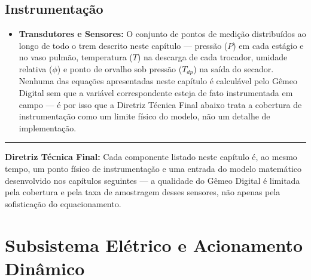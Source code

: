 \documentclass[12pt,a4paper]{article}
\numberwithin{equation}{section}
\numberwithin{table}{section}
\numberwithin{figure}{section}
\begin{document}
{	\subsection{\textbf{Instrumentação}}
	\begin{itemize}
		\item \textbf{Transdutores e Sensores:} O conjunto de pontos de medição distribuídos ao longo de todo o trem descrito neste capítulo — pressão ($P$) em cada estágio e no vaso pulmão, temperatura ($T$) na descarga de cada trocador, umidade relativa ($\phi$) e ponto de orvalho sob pressão ($T_{dp}$) na saída do secador. Nenhuma das equações apresentadas neste capítulo é calculável pelo Gêmeo Digital sem que a variável correspondente esteja de fato instrumentada em campo — é por isso que a Diretriz Técnica Final abaixo trata a cobertura de instrumentação como um limite físico do modelo, não um detalhe de implementação.
	\end{itemize}

	\vspace{1em}
	\hrule
	\vspace{1em}

	\textbf{Diretriz Técnica Final:} Cada componente listado neste capítulo é, ao mesmo tempo, um ponto físico de instrumentação e uma entrada do modelo matemático desenvolvido nos capítulos seguintes — a qualidade do Gêmeo Digital é limitada pela cobertura e pela taxa de amostragem desses sensores, não apenas pela sofisticação do equacionamento.

	
	
	\clearpage
	\section{\textbf{Subsistema Elétrico e Acionamento Dinâmico}}

}
\end{document}
